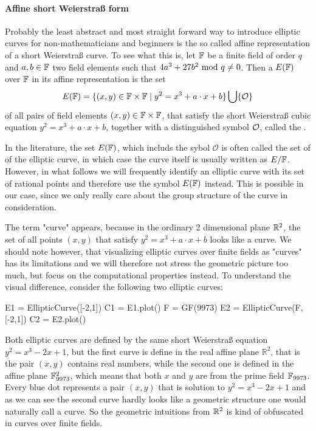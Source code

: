 \paragraph{Affine short Weierstraß form} Probably the least abstract and most straight forward way to introduce elliptic curves for non-mathematicians and beginners is the so called affine representation of a short Weierstraß curve. To see what this is, let $\mathbb{F}$ be a finite field of order $q$ and $a,b\in \mathbb{F}$ two field elements such that $4a^3+ 27b^2 \text{ mod } q\neq 0$. Then a  $E(\mathbb{F})$ over $\mathbb{F}$ in its affine representation is the set
\begin{equation}
\label{def_short_weierstrass_curve}
E(\mathbb{F}) = \{(x,y)\in \mathbb{F}\times \mathbb{F}\;|\; y^2=x^3+a\cdot x+b \} \bigcup \{\mathcal{O}\}
\end{equation}
of all pairs of field elements $(x,y)\in \mathbb{F}\times \mathbb{F}$, that satisfy the short Weierstraß cubic equation $y^2=x^3+a\cdot x+b$, together with a distinguished symbol $\mathcal{O}$, called the .
\begin{notation}
In the literature, the set $E(\mathbb{F})$, which includs the sybol $\mathcal{O}$ is often called the set of  of the elliptic curve, in which case the curve itself is usually written as $E/\mathbb{F}$. However, in what follows we will frequently identify an elliptic curve with its set of rational points and therefore use the symbol $E(\mathbb{F})$ instead. This is possible in our case, since we only really care about the group structure of the curve in consideration.
\end{notation}
The term "curve" appears, because in the ordinary 2 dimensional plane $\mathbb{R}^2$,
the set of all points $(x,y)$ that satisfy $y^2 = x^3 +a\cdot x +b$ looks like a curve. We should note however, that visualizing elliptic curves over finite fields as "curves" has its limitations and we will therefore not stress the geometric picture too much, but focus on the computational properties instead. To understand the visual difference, consider the following two elliptic curves: 
\begin{sagesilent}
E1 = EllipticCurve([-2,1])
C1 = E1.plot()
F = GF(9973)
E2 = EllipticCurve(F, [-2,1])
C2 = E2.plot()
\end{sagesilent}
\begin{center} 
\end{center}
Both elliptic curves are defined by the same short Weierstraß equation $y^2 = x^3-2x+1$, but the first curve is define in the real affine plane $\mathbb{R}^2$, that is the pair $(x,y)$ contains real numbers, while the second one is defined in the affine plane $\mathbb{F}_{9973}^2$, which means that both $x$ and $y$ are from the prime field $\mathbb{F}_{9973}$. Every blue dot represents a pair $(x,y)$ that is solution to $y^2 = x^3-2x+1$ and as we can see the second curve hardly looks like a geometric structure one would naturally call a curve. So the geometric intuitions from $\mathbb{R}^2$ is kind of obfuscated in curves over finite fields.

